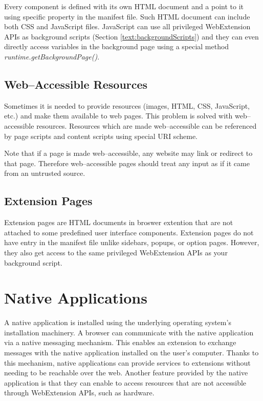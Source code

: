 Every component is defined with its own HTML document and a point to it using specific property in the manifest file. Such HTML document can include both CSS and JavaScript files. JavaScript can use all privileged WebExtension APIs as background scripts (Section \ref{text:backgroundScripts}) and they can even directly access variables in the background page using a special method \textit{runtime.getBackgroundPage()}. \cite{extensionAnatomy}

\subsection{Web--Accessible Resources}
Sometimes it is needed to provide resources (images, HTML, CSS, JavaScript, etc.) and make them available to web pages. This problem is solved with web--accessible resources. Resources which are made web--accessible can be referenced by page scripts and content scripts using special URI scheme. \cite{extensionAnatomy}

Note that if a page is made web--accessible, any website may link or redirect to that page. Therefore web--accessible pages should treat any input as if it came from an untrusted source. \cite{extensionWebAccessibleResources}

\subsection{Extension Pages}
Extension pages are HTML documents in broswer extention that are not attached to some predefined user interface components. Extension pages do not have entry in the manifest file unlike sidebars, popups, or option pages. However, they also get access to the same privileged WebExtension APIs as your background script. \cite{extensionAnatomy}

\section{Native Applications}
A native application is installed using the underlying operating system's installation machinery. A browser can communicate with the native application via a native messaging mechanism. This enables an extension to exchange messages with the native application installed on the user's computer. Thanks to this mechanism, native applications can provide services to extensions without needing to be reachable over the web. Another feature provided by the native application is that they can enable to access resources that are not accessible through WebExtension APIs, such as hardware. \cite{extensionNativeMessaging}

